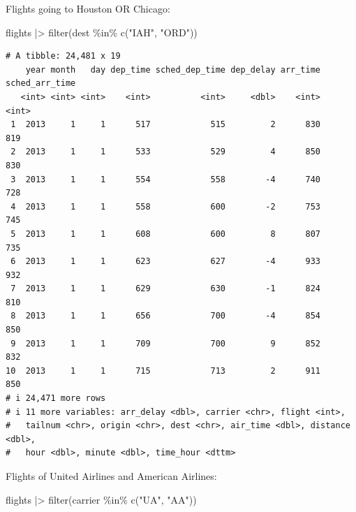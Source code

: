 \documentclass[
  letterpaper,
  DIV=11,
  numbers=noendperiod]{scrreprt}
\newenvironment{Shaded}{\begin{snugshade}}{\end{snugshade}}
\newcommand{\FunctionTok}[1]{\textcolor[rgb]{0.28,0.35,0.67}{#1}}
\newcommand{\NormalTok}[1]{\textcolor[rgb]{0.00,0.23,0.31}{#1}}
\newcommand{\SpecialCharTok}[1]{\textcolor[rgb]{0.37,0.37,0.37}{#1}}
\newcommand{\StringTok}[1]{\textcolor[rgb]{0.13,0.47,0.30}{#1}}
\begin{document}
Flights going to Houston OR Chicago:

\begin{Shaded}
\begin{Highlighting}[]
\NormalTok{flights }\SpecialCharTok{|\textgreater{}}
  \FunctionTok{filter}\NormalTok{(dest }\SpecialCharTok{\%in\%} \FunctionTok{c}\NormalTok{(}\StringTok{"IAH"}\NormalTok{, }\StringTok{"ORD"}\NormalTok{))}
\end{Highlighting}
\end{Shaded}

\begin{verbatim}
# A tibble: 24,481 x 19
    year month   day dep_time sched_dep_time dep_delay arr_time sched_arr_time
   <int> <int> <int>    <int>          <int>     <dbl>    <int>          <int>
 1  2013     1     1      517            515         2      830            819
 2  2013     1     1      533            529         4      850            830
 3  2013     1     1      554            558        -4      740            728
 4  2013     1     1      558            600        -2      753            745
 5  2013     1     1      608            600         8      807            735
 6  2013     1     1      623            627        -4      933            932
 7  2013     1     1      629            630        -1      824            810
 8  2013     1     1      656            700        -4      854            850
 9  2013     1     1      709            700         9      852            832
10  2013     1     1      715            713         2      911            850
# i 24,471 more rows
# i 11 more variables: arr_delay <dbl>, carrier <chr>, flight <int>,
#   tailnum <chr>, origin <chr>, dest <chr>, air_time <dbl>, distance <dbl>,
#   hour <dbl>, minute <dbl>, time_hour <dttm>
\end{verbatim}

Flights of United Airlines and American Airlines:

\begin{Shaded}
\begin{Highlighting}[]
\NormalTok{flights }\SpecialCharTok{|\textgreater{}}
  \FunctionTok{filter}\NormalTok{(carrier }\SpecialCharTok{\%in\%} \FunctionTok{c}\NormalTok{(}\StringTok{"UA"}\NormalTok{, }\StringTok{"AA"}\NormalTok{))}
\end{Highlighting}
\end{Shaded}
\end{document}
